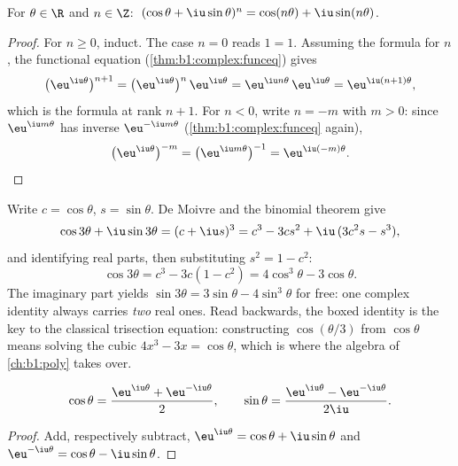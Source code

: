\begin{corollary}\label{cor:b1:complex:demoivre}
For $\theta \in \R$ and $n \in \Z$:
$\;(\cos\theta + \iu\sin\theta)^n = \cos(n\theta) +
\iu\sin(n\theta)$.
\end{corollary}

\begin{proof}
For $n \geq 0$, induct. The case $n = 0$ reads $1 = 1$. Assuming
the formula for $n$, the functional equation
(\cref{thm:b1:complex:funceq}) gives
\[
\bigl(\eu^{\iu\theta}\bigr)^{n+1}
= \bigl(\eu^{\iu\theta}\bigr)^{n}\,\eu^{\iu\theta}
= \eu^{\iu n\theta}\,\eu^{\iu\theta}
= \eu^{\iu(n+1)\theta} ,
\]
which is the formula at rank $n + 1$. For $n < 0$, write $n = -m$
with $m > 0$: since $\eu^{\iu m\theta}$ has inverse
$\eu^{-\iu m\theta}$ (\cref{thm:b1:complex:funceq} again),
\[
\bigl(\eu^{\iu\theta}\bigr)^{-m}
= \bigl(\eu^{\iu m\theta}\bigr)^{-1}
= \eu^{\iu(-m)\theta} . \qedhere
\]
\end{proof}

\begin{example}\label{ex:b1:complex:cos3}
Write $c = \cos\theta$, $s = \sin\theta$. De Moivre and the binomial
theorem give
\[
\cos 3\theta + \iu \sin 3\theta = (c + \iu s)^3
= c^3 - 3cs^2 + \iu\,(3c^2 s - s^3),
\]
and identifying real parts, then substituting $s^2 = 1 - c^2$:
\[
\cos 3\theta = c^3 - 3c(1 - c^2) = 4\cos^3\theta - 3\cos\theta .
\]
The imaginary part yields $\sin 3\theta = 3\sin\theta -
4\sin^3\theta$ for free: one complex identity always carries
\emph{two} real ones. Read backwards, the boxed identity is the
key to the classical trisection equation: constructing
$\cos(\theta/3)$ from $\cos\theta$ means solving the cubic $4x^3 -
3x = \cos\theta$, which is where the algebra of
\cref{ch:b1:poly} takes over.
\end{example}

\begin{proposition}\label{prop:b1:complex:euler}
\[
\cos\theta = \frac{\eu^{\iu\theta} + \eu^{-\iu\theta}}{2},
\qquad
\sin\theta = \frac{\eu^{\iu\theta} - \eu^{-\iu\theta}}{2\iu}.
\]
\end{proposition}

\begin{proof}
Add, respectively subtract, $\eu^{\iu\theta} = \cos\theta +
\iu\sin\theta$ and $\eu^{-\iu\theta} = \cos\theta - \iu\sin\theta$.
\end{proof}

